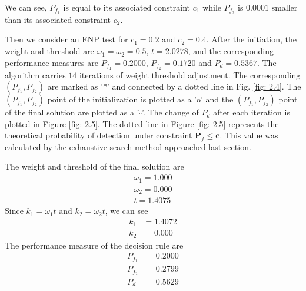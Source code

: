 We can see, $P_{f_1}$ is equal to its associated constraint $c_1$  while $P_{f_2}$ is $0.0001$ smaller than its associated  constraint $c_2$. 


Then we consider an ENP test for $c_1 = 0.2$ and $c_2 = 0.4$.
After the initiation, the weight and threshold are $\omega_1 = \omega_2 = 0.5$, $t =2.0278$, and the corresponding performance measures are $P_{f_1}  = 0.2000$, $P_{f_2} = 0.1720$ and $P_d = 0.5367$. The algorithm carries $14$ iterations of weight  threshold adjustment. The corresponding $(P_{f_1}, P_{f_2})$ are   
marked as '*' and connected by a dotted line in Fig. \ref{fig: 2.4}. 
The $(P_{f_1}, P_{f_2})$ point of the initialization is plotted as  a 'o' and the $(P_{f_1}, P_{f_2})$ point of the final solution are plotted as a '$\square$'. The change of $P_d$ after each iteration is plotted in Figure \ref{fig: 2.5}. 
The dotted line in Figure \ref{fig: 2.5} represents the theoretical probability of detection under constraint $\mathbf{P}_f \leq \mathbf{c}$. This value was calculated by the exhaustive search method approached last section.  


The weight and threshold of the final solution are
\[
\begin{split}
\omega_1 = 1.000\\
\omega_2 = 0.000\\
t = 1.4075
\end{split}
\]
Since $k_1 = \omega_1t$ and $k_2 = \omega_2t$, we can see
\[
\begin{split}
k_1 &= 1.4072\\
k_2 &= 0.000
\end{split}
\]
The performance measure of the decision rule are
\[
\begin{split}
P_{f_1} &= 0.2000\\
P_{f_2} &= 0.2799\\
P_d &= 0.5629
\end{split}
\]


